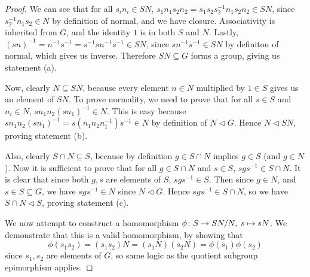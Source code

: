 \begin{proof}
    We can see that for all \(s_i n_i \in SN\),
    \(s_1 n_1 s_2 n_2 = s_1 s_2 s_2^{-1} n_1 s_2 n_2 \in SN\),
    since \(s_2^{-1} n_1 s_2 \in N\) by definition of normal,
    and we have closure.
    Associativity is inherited from \(G\),
    and the identity \(1\) is in both \(S\) and \(N\).
    Lastly, \({(sn)}^{-1} = n^{-1}s^{-1} = s^{-1}sn^{-1}s^{-1} \in SN\),
    since \(sn^{-1}s^{-1} \in SN\) by definiton of normal,
    which gives us inverse.
    Therefore \(SN \subseteq G\) forms a group,
    giving us statement (a).

    \medskip

    Now, clearly \(N \subseteq SN\),
    because every element \(n \in N\) multiplied by \(1 \in S\)
    gives us an element of \(SN\).
    To prove normality,
    we need to prove that for all \(s \in S\) and \(n_i \in N\),
    \(sn_1 n_2 {(sn_1)}^{-1} \in N\).
    This is easy because \(sn_1 n_2 {(sn_1)}^{-1}
    = s(n_1 n_2 n_1^{-1})s^{-1} \in N\)
    by definition of \(N \lhd G\).
    Hence \(N \lhd SN\), proving statement (b).

    \medskip

    Also, clearly \(S \cap N \subseteq S\),
    because by definition \(g \in S \cap N\)
    implies \(g \in S\) (and \(g \in N\)).
    Now it is sufficient to prove that
    for all \(g \in S \cap N\) and \(s \in S\),
    \(sgs^{-1} \in S \cap N\).
    It is clear that since both \(g,s\) are elements of \(S\),
    \(sgs^{-1} \in S\).
    Then since \(g \in N\), and \(s \in S \subseteq G\),
    we have \(sgs^{-1} \in N\) since \(N \lhd G\).
    Hence \(sgs^{-1} \in S \cap N\),
    so we have \(S \cap N \lhd S\),
    proving statement (c).

    \medskip

    We now attempt to construct a homomorphism
    \(\phi\colon S\to SN/N,\;s\mapsto sN\).
    We demonstrate that this is a valid homomorphism,
    by showing that
    \begin{equation*}
        \phi(s_1 s_2) = (s_1 s_2)N = (s_1 N)(s_2 N) = \phi(s_1)\phi(s_2)
    \end{equation*}
    since \(s_1,s_2\) are elements of \(G\),
    so same logic as the quotient subgroup epimorphism applies.


\end{proof}
